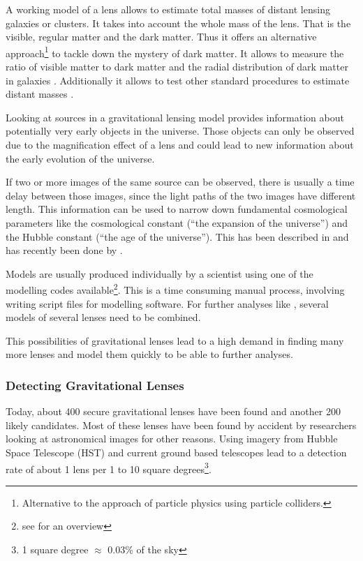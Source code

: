 \documentclass[11pt]{article}
\begin{document}
A working model of a lens allows to estimate total masses of distant lensing galaxies or clusters.
It takes into account the whole mass of the lens.
That is the visible, regular matter and the dark matter\cite{kochanek1995there}.
Thus it offers an alternative approach\footnote{Alternative to the approach of particle physics using particle colliders.} to tackle down the mystery of dark matter.
It allows to measure the ratio of visible matter to dark matter and the radial distribution of dark matter in galaxies \cite{treukoop04}.
Additionally it allows to test other standard procedures to estimate distant masses \cite{kochanek1995there}.

Looking at sources in a gravitational lensing model provides information about potentially very early objects in the universe.
Those objects can only be observed due to the magnification effect of a lens and could lead to new information about the early evolution of the universe\cite{rusin03}.

If two or more images of the same source can be observed, there is usually a time delay between those images, since the light paths of the two images have different length.
This information can be used to narrow down fundamental cosmological parameters like the cosmological constant (``the expansion of the universe'') and the Hubble constant (``the age of the universe'').
This has been described in \cite{refsdal1964} and has recently been done by \cite{age_uni}.


Models are usually produced individually by a scientist using one of the modelling codes available\footnote{see \cite{overview_soft2013} for an overview}.
This is a time consuming manual process, involving writing script files for modelling software.
For further analyses like \cite{age_uni}, several models of several lenses need to be combined.

This possibilities of gravitational lenses lead to a high demand in finding many more lenses and model them quickly to be able to further analyses.



\subsubsection{Detecting Gravitational Lenses}

Today, about 400 secure gravitational lenses have been found and another 200 likely candidates.
Most of these lenses have been found by accident by researchers looking at astronomical images for other reasons.
Using imagery from Hubble Space Telescope (HST) and current ground based telescopes lead to a detection rate of about 1 lens per 1 to 10 square degrees\footnote{1 square degree $\approx$ 0.03\% of the sky}.
\end{document}
